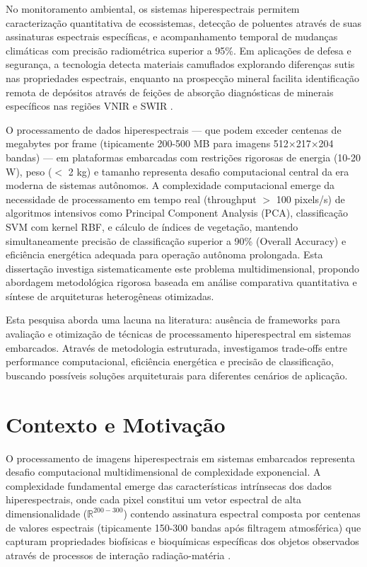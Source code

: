 No monitoramento ambiental, os sistemas hiperespectrais permitem caracterização 
quantitativa de ecossistemas, detecção de poluentes através de suas assinaturas 
espectrais específicas, e acompanhamento temporal de mudanças climáticas com 
precisão radiométrica superior a 95\%. Em aplicações de defesa e segurança, 
a tecnologia detecta materiais camuflados explorando diferenças sutis nas 
propriedades espectrais, enquanto na prospecção mineral facilita identificação 
remota de depósitos através de feições de absorção diagnósticas de minerais 
específicos nas regiões VNIR e SWIR \cite{Baptista2019}.

O processamento de dados hiperespectrais --- que podem exceder centenas de 
megabytes por frame (tipicamente 200-500 MB para imagens 512×217×204 bandas) --- 
em plataformas embarcadas com restrições rigorosas de energia (10-20 W), peso 
($<$ 2 kg) e tamanho representa desafio computacional central da era moderna 
de sistemas autônomos. A complexidade computacional emerge da necessidade de 
processamento em tempo real (throughput $>$ 100 pixels/s) de algoritmos 
intensivos como Principal Component Analysis (PCA), classificação SVM com 
kernel RBF, e cálculo de índices de vegetação, mantendo simultaneamente 
precisão de classificação superior a 90\% (Overall Accuracy) e eficiência 
energética adequada para operação autônoma prolongada. Esta dissertação 
investiga sistematicamente este problema multidimensional, propondo abordagem 
metodológica rigorosa baseada em análise comparativa quantitativa e síntese 
de arquiteturas heterogêneas otimizadas.

Esta pesquisa aborda uma lacuna na literatura: ausência de frameworks para 
avaliação e otimização de técnicas de processamento hiperespectral em 
sistemas embarcados. Através de metodologia estruturada, investigamos 
trade-offs entre performance computacional, eficiência energética e precisão 
de classificação, buscando possíveis soluções arquiteturais para diferentes cenários 
de aplicação.

\section{Contexto e Motivação}\label{sec:contexto_motivacao}

O processamento de imagens hiperespectrais em sistemas embarcados representa 
desafio computacional multidimensional de complexidade exponencial. A 
complexidade fundamental emerge das características intrínsecas dos dados 
hiperespectrais, onde cada pixel constitui um vetor espectral de alta 
dimensionalidade ($\mathbb{R}^{200-300}$) contendo assinatura espectral 
composta por centenas de valores espectrais (tipicamente 150-300 bandas após 
filtragem atmosférica) que capturam propriedades biofísicas e bioquímicas 
específicas dos objetos observados através de processos de interação 
radiação-matéria \cite{Zhang2024}.

